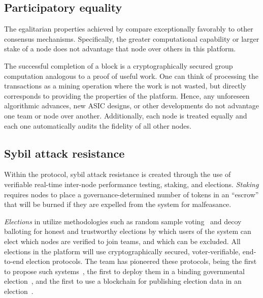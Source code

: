\subsection{Participatory equality}

The egalitarian properties achieved by \name compare exceptionally favorably to other consensus mechanisms. Specifically, the greater computational capability or larger stake of a node does not advantage that node over others in this platform.

The successful completion of a block is a cryptographically secured group computation analogous to a proof of useful work. One can think of processing the transactions as a mining operation where the work is not wasted, but directly corresponds to providing the properties of the platform. Hence, any unforeseen algorithmic advances, new ASIC designs, or other developments do not advantage one team or node over another. Additionally, each node is treated equally and each one automatically audits the fidelity of all other nodes.

\subsection{Sybil attack resistance}
Within the \name protocol, sybil attack \cite{sybil} resistance is created through the use of verifiable real-time inter-node performance testing, staking, and elections. \textit{Staking} requires nodes to place a governance-determined number of tokens in an “escrow” that will be burned if they are expelled from the system for malfeasance.

\textit{Elections} in \name utilize methodologies such as random sample voting~\cite{rsv} and decoy balloting for honest and trustworthy elections by which users of the system can elect which nodes are verified to join teams, and which can be excluded. All elections in the \name platform will use cryptographically secured, voter-verifiable, end-to-end election protocols. The \name team has pioneered these protocols, being the first to propose such systems~\cite{unconditionalsecretballots}, the first to deploy them in a binding governmental election~\cite{takomapark}, and the first to use a blockchain for publishing election data in an election~\cite{commitcoin}.

